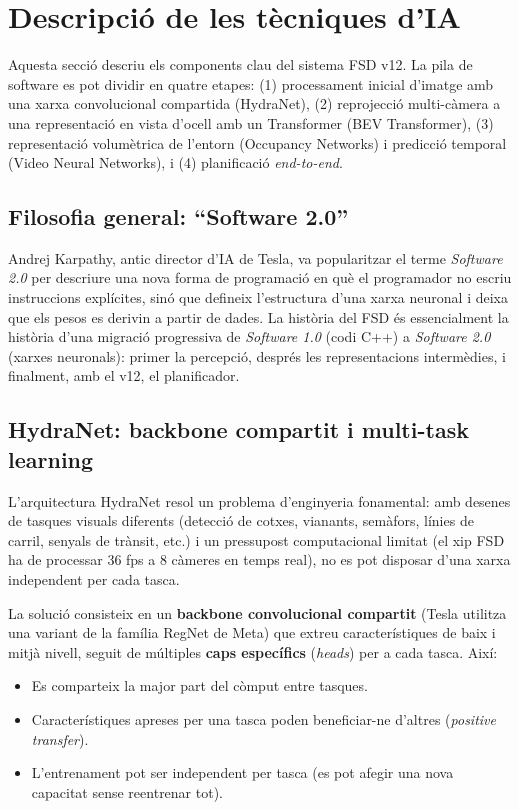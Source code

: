 \documentclass[11pt,a4paper]{article}
\begin{document}
\section{Descripció de les tècniques d'IA}

Aquesta secció descriu els components clau del sistema FSD v12. La pila de software es pot dividir en quatre etapes: (1) processament inicial d'imatge amb una xarxa convolucional compartida (HydraNet), (2) reprojecció multi-càmera a una representació en vista d'ocell amb un Transformer (BEV Transformer), (3) representació volumètrica de l'entorn (Occupancy Networks) i predicció temporal (Video Neural Networks), i (4) planificació \emph{end-to-end}.

\subsection{Filosofia general: ``Software 2.0''}

Andrej Karpathy, antic director d'IA de Tesla, va popularitzar el terme \emph{Software 2.0} \cite{karpathy2017} per descriure una nova forma de programació en què el programador no escriu instruccions explícites, sinó que defineix l'estructura d'una xarxa neuronal i deixa que els pesos es derivin a partir de dades. La història del FSD és essencialment la història d'una migració progressiva de \emph{Software 1.0} (codi C++) a \emph{Software 2.0} (xarxes neuronals): primer la percepció, després les representacions intermèdies, i finalment, amb el v12, el planificador.

\subsection{HydraNet: backbone compartit i multi-task learning}

L'arquitectura HydraNet \cite{tesla2021} resol un problema d'enginyeria fonamental: amb desenes de tasques visuals diferents (detecció de cotxes, vianants, semàfors, línies de carril, senyals de trànsit, etc.) i un pressupost computacional limitat (el xip FSD ha de processar 36 fps a 8 càmeres en temps real), no es pot disposar d'una xarxa independent per cada tasca.

La solució consisteix en un \textbf{backbone convolucional compartit} (Tesla utilitza una variant de la família RegNet de Meta) que extreu característiques de baix i mitjà nivell, seguit de múltiples \textbf{caps específics} (\emph{heads}) per a cada tasca. Així:

\begin{itemize}[leftmargin=*]
    \item Es comparteix la major part del còmput entre tasques.
    \item Característiques apreses per una tasca poden beneficiar-ne d'altres (\emph{positive transfer}).
    \item L'entrenament pot ser independent per tasca (es pot afegir una nova capacitat sense reentrenar tot).
\end{itemize}
\end{document}
